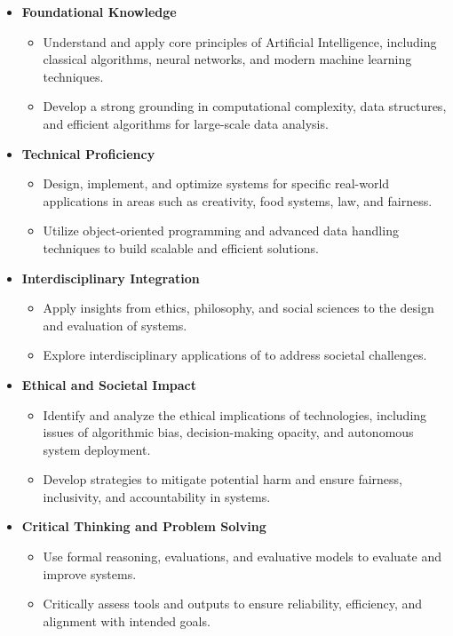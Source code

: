 \begin{itemize}
    \item \textbf{Foundational Knowledge}
    \begin{itemize}
        \item Understand and apply core principles of Artificial Intelligence, including classical algorithms, neural networks, and modern machine learning techniques.
        \item Develop a strong grounding in computational complexity, data structures, and efficient algorithms for large-scale data analysis.
    \end{itemize}

    \item \textbf{Technical Proficiency}
    \begin{itemize}
        \item Design, implement, and optimize \ai{} systems for specific real-world applications in areas such as creativity, food systems, law, and fairness.
        \item Utilize object-oriented programming and advanced data handling techniques to build scalable and efficient \ai{} solutions.
    \end{itemize}

    \item \textbf{Interdisciplinary Integration}
    \begin{itemize}
        \item Apply insights from ethics, philosophy, and social sciences to the design and evaluation of \ai{} systems.
        \item Explore interdisciplinary applications of \ai{} to address societal challenges.
    \end{itemize}

    \item \textbf{Ethical and Societal Impact}
    \begin{itemize}
        \item Identify and analyze the ethical implications of \ai{} technologies, including issues of algorithmic bias, decision-making opacity, and autonomous system deployment.
        \item Develop strategies to mitigate potential harm and ensure fairness, inclusivity, and accountability in \ai{} systems.
    \end{itemize}

    \item \textbf{Critical Thinking and Problem Solving}
    \begin{itemize}
        \item Use formal reasoning, evaluations, and evaluative models to evaluate and improve \ai{} systems.
        \item Critically assess \ai{} tools and outputs to ensure reliability, efficiency, and alignment with intended goals.
    \end{itemize}


\end{itemize}

